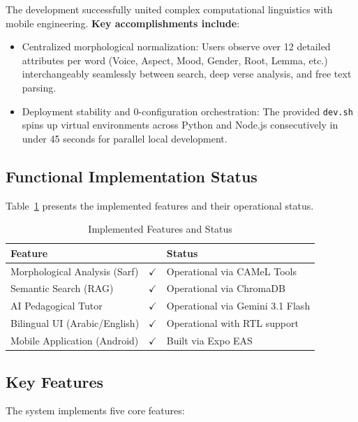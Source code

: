 \documentclass[11pt, a4paper]{article}
\begin{document}
The development successfully united complex computational linguistics with mobile engineering. 
\textbf{Key accomplishments include}:
\begin{itemize}
    \item Centralized morphological normalization: Users observe over 12 detailed attributes per word (Voice, Aspect, Mood, Gender, Root, Lemma, etc.) interchangeably seamlessly between search, deep verse analysis, and free text parsing.
    \item Deployment stability and 0-configuration orchestration: The provided \texttt{dev.sh} spins up virtual environments across Python and Node.js consecutively in under 45 seconds for parallel local development.
\end{itemize}

\subsection{Functional Implementation Status}
Table~\ref{tab:feature-status} presents the implemented features and their operational status.

\begin{table}[H]
\caption{Implemented Features and Status}
\label{tab:feature-status}
\begin{tabular}{|lcl|}
\toprule
\textbf{Feature} & & \textbf{Status} \\
\midrule
Morphological Analysis (Sarf) & $\checkmark$ & Operational via CAMeL Tools \\
Semantic Search (RAG) & $\checkmark$ & Operational via ChromaDB \\
AI Pedagogical Tutor & $\checkmark$ & Operational via Gemini 3.1 Flash \\
Bilingual UI (Arabic/English) & $\checkmark$ & Operational with RTL support \\
Mobile Application (Android) & $\checkmark$ & Built via Expo EAS \\
\bottomrule
\end{tabular}
\end{table}

\subsection{Key Features}
The system implements five core features:
\end{document}

